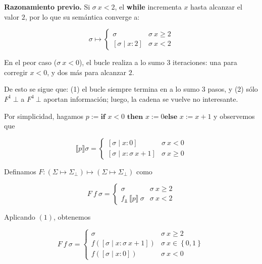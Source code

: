\documentclass[a4paper, 12pt]{article}
\begin{document}
\begin{helpframe}
  
\textbf{Razonamiento previo.} Si $\sigma ~ x < 2$, el \textbf{while} incrementa $x$ hasta alcanzar el valor $2$, por lo que su semántica converge a:

\[
\sigma \mapsto 
\begin{cases}
\sigma & \sigma ~ x \geq 2 \\
[\sigma \mid x : 2] & \sigma ~ x < 2
\end{cases}
\]

En el peor caso ($\sigma ~ x < 0$), el bucle realiza a lo sumo $3$ iteraciones: una para corregir $x < 0$, y dos más para alcanzar $2$.

De esto se sigue que: (1) el bucle siempre termina en a lo sumo $3$ pasos, y (2)
sólo $F^1 ~ \bot$ a $F^4 ~ \bot$ aportan información; luego, la cadena se vuelve
no interesante.
\end{helpframe}

Por simplicidad, hagamos $p := \textbf{if } x < 0 \textbf{ then } x:=0 \textbf{
else } x := x+1$ y observemos que

\begin{equation}
  \llbracket p \rrbracket \sigma = \begin{cases}
    [\sigma \mid x : 0] & \sigma ~x < 0 \\ 
    [\sigma \mid x : \sigma ~ x + 1] & \sigma~ x \geq 0
  \end{cases}
\end{equation}

Definamos $F : (\Sigma
\mapsto \Sigma_\bot ) \mapsto (\Sigma \mapsto \Sigma_\bot )$ como 

\begin{equation*}
  F ~ f ~ \sigma = \begin{cases}
    \sigma & \sigma ~ x \geq 2 \\ 
    f_{\Bot} ~ \llbracket p \rrbracket ~ \sigma & \sigma ~ x < 2
  \end{cases}
\end{equation*}

Aplicando $(1)$, obtenemos


\begin{equation*}
  F ~ f ~\sigma = \begin{cases}
    \sigma & \sigma ~ x \geq 2 \\ 
    f \left( [\sigma \mid x : \sigma ~ x + 1] \right) & \sigma ~ x \in \left\{
    0, 1 \right\} \\
    f \left( [\sigma \mid x : 0] \right) &\sigma ~ x < 0
  \end{cases}
\end{equation*}
\end{document}
